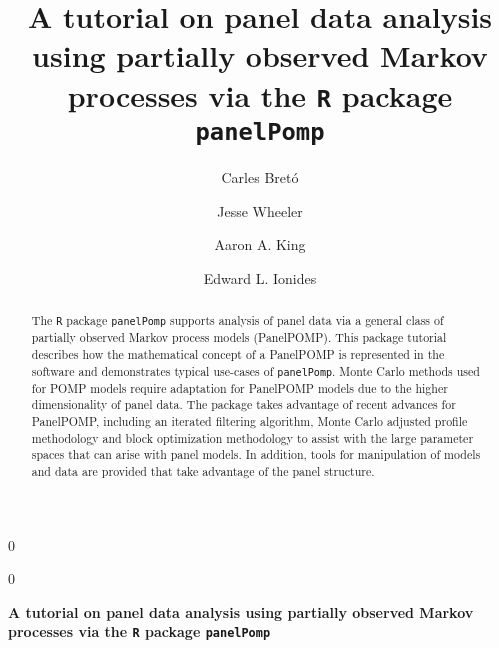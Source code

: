 \documentclass[12pt]{article}\usepackage[]{graphicx}\usepackage[table]{xcolor}
\newcommand{\blind}{0}
\newcommand\R{\texttt{R}\xspace}
\newcommand\panelPomp{\texttt{panelPomp}\xspace}
\begin{document}
%

\def\spacingset#1{\renewcommand{\baselinestretch}%
{#1}\small\normalsize} \spacingset{1}




\blind
{
  \title{\bf A tutorial on panel data analysis using partially observed Markov processes via the \R package \panelPomp}

  \author[1]{Carles Bret\'o}
  \author[2]{Jesse Wheeler}
  \author[2]{Aaron A. King}
  \author[2]{Edward L. Ionides}


  \maketitle
} \fi

\blind
{
  \bigskip
  \bigskip
  \bigskip
  \begin{center}
    {\Large\bf A tutorial on panel data analysis using partially observed Markov processes via the \R package \panelPomp}
\end{center}
  \medskip
} \fi

\bigskip
\begin{abstract}
\noindent The \R package \panelPomp supports analysis of panel data via a general class of partially observed Markov process models (PanelPOMP).
This package tutorial describes how the mathematical concept of a PanelPOMP is represented in the software and demonstrates typical use-cases of \panelPomp.
Monte Carlo methods used for POMP models require adaptation for PanelPOMP models due to the higher dimensionality of panel data.
The package takes advantage of recent advances for PanelPOMP, including an iterated filtering algorithm, Monte Carlo adjusted profile methodology and block optimization methodology to assist with the large parameter spaces that can arise with panel models.
In addition, tools for manipulation of models and data are provided that take advantage of the panel structure.
\end{abstract}
\end{document}
